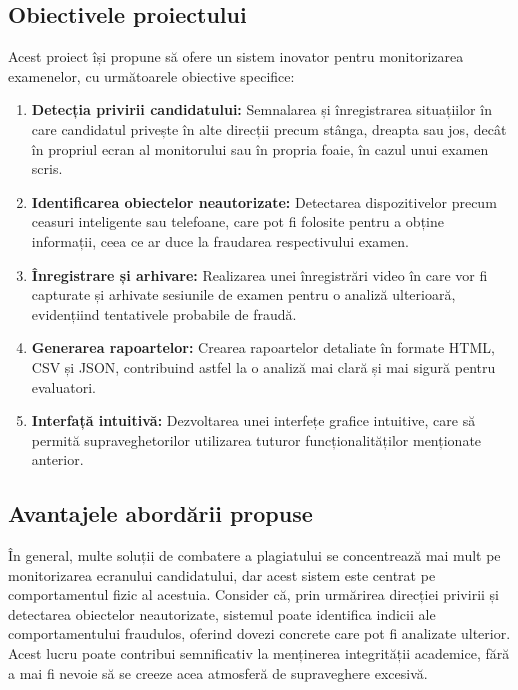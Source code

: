\documentclass[12pt,a4paper]{article}
\begin{document}
\newpage

\subsection{Obiectivele proiectului}

Acest proiect își propune să ofere un sistem inovator pentru monitorizarea examenelor, cu următoarele obiective specifice:

\begin{enumerate}[label=\arabic*.]
    \item \textbf{Detecția privirii candidatului:} Semnalarea și înregistrarea situațiilor
    în care candidatul privește în alte direcții precum stânga, dreapta sau jos, 
    decât în propriul ecran al monitorului sau în propria foaie, în cazul unui examen scris.
    
    \item \textbf{Identificarea obiectelor neautorizate:} Detectarea dispozitivelor precum
    ceasuri inteligente sau telefoane, care pot fi folosite pentru a obține informații, 
    ceea ce ar duce la fraudarea respectivului examen.
    
    \item \textbf{Înregistrare și arhivare:} Realizarea unei înregistrări video în care 
    vor fi capturate și arhivate sesiunile de examen pentru o analiză ulterioară, 
    evidențiind tentativele probabile de fraudă.
    
    \item \textbf{Generarea rapoartelor:} Crearea rapoartelor detaliate în formate HTML, CSV și JSON,
    contribuind astfel la o analiză mai clară și mai sigură pentru evaluatori.
    
    \item \textbf{Interfață intuitivă:} Dezvoltarea unei interfețe grafice intuitive, care să permită
    supraveghetorilor utilizarea tuturor funcționalităților menționate anterior.
\end{enumerate}

\subsection{Avantajele abordării propuse}

În general, multe soluții de combatere a plagiatului se concentrează mai mult 
pe monitorizarea ecranului candidatului, dar acest sistem este centrat pe 
comportamentul fizic al acestuia. Consider că, prin urmărirea direcției privirii 
și detectarea obiectelor neautorizate, sistemul poate identifica indicii ale
comportamentului fraudulos, oferind dovezi concrete care pot fi analizate ulterior. 
Acest lucru poate contribui semnificativ la menținerea integrității academice, 
fără a mai fi nevoie să se creeze acea atmosferă de supraveghere excesivă.
\end{document}
